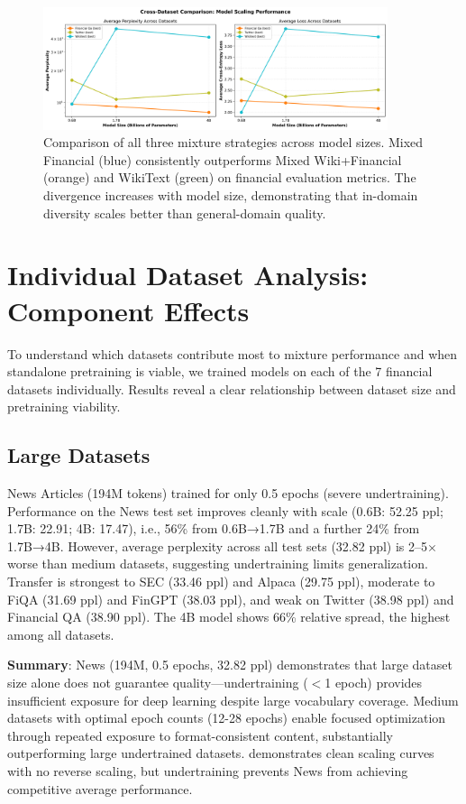 \begin{figure}[htbp]
\centering
\includegraphics[width=0.9\textwidth]{figures/scaling_comparison_all.png}
\caption[Comparison of Mixture Strategies]{Comparison of all three mixture strategies across model sizes. Mixed Financial (blue) consistently outperforms Mixed Wiki+Financial (orange) and WikiText (green) on financial evaluation metrics. The divergence increases with model size, demonstrating that in-domain diversity scales better than general-domain quality.}
\label{fig:scaling_comparison_all}
\end{figure}

\section{Individual Dataset Analysis: Component Effects}

To understand which datasets contribute most to mixture performance and when standalone pretraining is viable, we trained models on each of the 7 financial datasets individually. Results reveal a clear relationship between dataset size and pretraining viability.

\subsection{Large Datasets}

News Articles (194M tokens) trained for only 0.5 epochs (severe undertraining). Performance on the News test set improves cleanly with scale (0.6B: 52.25 ppl; 1.7B: 22.91; 4B: 17.47), i.e., 56\% from 0.6B→1.7B and a further 24\% from 1.7B→4B. However, average perplexity across all test sets (32.82 ppl) is 2–5$\times$ worse than medium datasets, suggesting undertraining limits generalization. Transfer is strongest to SEC (33.46 ppl) and Alpaca (29.75 ppl), moderate to FiQA (31.69 ppl) and FinGPT (38.03 ppl), and weak on Twitter (38.98 ppl) and Financial QA (38.90 ppl). The 4B model shows 66\% relative spread, the highest among all datasets.

\textbf{Summary}: News (194M, 0.5 epochs, 32.82 ppl) demonstrates that large dataset size alone does not guarantee quality—undertraining ($<$1 epoch) provides insufficient exposure for deep learning despite large vocabulary coverage. Medium datasets with optimal epoch counts (12-28 epochs) enable focused optimization through repeated exposure to format-consistent content, substantially outperforming large undertrained datasets.  demonstrates clean scaling curves with no reverse scaling, but undertraining prevents News from achieving competitive average performance.


